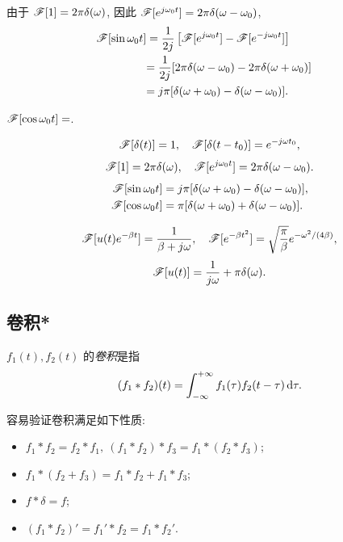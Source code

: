 \documentclass[nocolor,theme=doremi,lang=cn,11pt,chinese,twoside,openright,usesamecnt]{elegantbook}
\newenvironment{block}[1]{\begin{tcolorbox}[blockstyle,title=#1]}{\end{tcolorbox}}
\newenvironment{alertblock}[1]{\begin{tcolorbox}[alertstyle,title=#1]}{\end{tcolorbox}}
\begin{document}
\begin{solution}
		由于 $\mathscr{F}[1]=2\pi\delta(\omega)$,
	{因此 $\mathscr{F}[e^{j\omega_0t}]=2\pi\delta(\omega-\omega_0)$,
	}
	{\begin{align*}
			\mathscr{F}[\sin{\omega_0 t}]&=\frac1{2j}\left[\mathscr{F}[e^{j\omega_0t}]-\mathscr{F}[e^{-j\omega_0t}]\right]&\\
			&{=\frac1{2j}[2\pi\delta(\omega-\omega_0)-2\pi\delta(\omega+\omega_0)]}&\\
			&{=j\pi[\delta(\omega+\omega_0)-\delta(\omega-\omega_0)].}
		\end{align*}
	}
\end{solution}

\begin{exercise}
	$\mathscr{F}[\cos{\omega_0 t}]=$.
\end{exercise}

\begin{alertblock}{常见傅里叶变换汇总 I}
	\[\mathscr{F}[\delta(t)]=1,\quad \mathscr{F}[\delta(t-t_0)]=e^{-j\omega t_0},\]
	\[\mathscr{F}[1]=2\pi\delta(\omega),\quad \mathscr{F}[e^{j\omega_0 t}]=2\pi\delta(\omega-\omega_0).\]
	\begin{align*}
	\mathscr{F}[\sin \omega_0t]&=j\pi[\delta(\omega+\omega_0)-\delta(\omega-\omega_0)],\\
	\mathscr{F}[\cos{\omega_0 t}]&=\pi[\delta(\omega+\omega_0)+\delta(\omega-\omega_0)].
	\end{align*}
\end{alertblock}

\begin{block}{常见傅里叶变换汇总 II}
	\[\mathscr{F}[u(t)e^{-\beta t}]=\dfrac1{\beta+j\omega},\quad
	\mathscr{F}[e^{-\beta t^2}]=\sqrt{\dfrac\pi\beta}e^{-\omega^2/(4\beta)},\]
	\[\mathscr{F}[u(t)]=\dfrac1{j\omega}+\pi\delta(\omega).\]
\end{block}

\subsection{卷积*}

\begin{definition}
	$f_1(t),f_2(t)$ 的\emph{卷积}是指
	\[(f_1\ast f_2)(t)=\int_{-\infty}^{+\infty} f_1(\tau)f_2(t-\tau)\,\mathrm{d} \tau.\]
\end{definition}

容易验证卷积满足如下性质:
\begin{itemize}
	\item $f_1\ast f_2=f_2\ast f_1,\ (f_1\ast f_2)\ast f_3=f_1\ast(f_2\ast f_3)$;
	\item $f_1\ast(f_2+f_3)=f_1\ast f_2+f_1\ast f_3$;
	\item $f\ast\delta=f$;
	\item $(f_1\ast f_2)'=f_1'\ast f_2=f_1\ast f_2'$.
\end{itemize}
\end{document}
